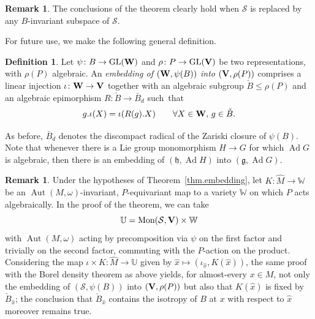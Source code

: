 \documentclass[10pt,a4paper]{amsart}
\numberwithin{equation}{section}
\theoremstyle{definition}
\newtheorem{defin}[thm]{Definition}
\newtheorem{rem}[thm]{Remark}
\def\V{{\bf V}}
\def\W{{\bf W}}
\newcommand{\cS}{{\mathcal S}}
\newcommand{\lieh}{\mathfrak{h}}
\def\g{{\mathfrak g}}
\newcommand{\Aut}{\operatorname{Aut}}
\newcommand{\Ad}{\operatorname{Ad}}
\newcommand{\GL}{{\operatorname{GL}}}
\begin{document}
\begin{rem}
The conclusions of the theorem clearly hold when $\mathcal{S}$ is replaced by any $B$-invariant subspace of $\mathcal{S}$.
\end{rem}

For future use, we make the following general definition.

\begin{defin}
\label{def.rep.embedding}
Let $\psi\colon B \rightarrow \GL({\W})$ and $\rho \colon P \rightarrow \GL({\V})$ be two representations, with $\rho(P)$ algebraic. An \emph{embedding of $({\W}, \psi(B))$ into $({\V}, \rho(P))$} comprises a linear injection $\iota\colon {\W} \rightarrow {\V}$ together with an algebraic subgroup $\check{B} \leq \rho(P)$ and an algebraic epimorphism $R\colon \check{B} \rightarrow \bar{B}_d$ such~that
\[ g. \iota(X) = \iota( R(g).X) \qquad \forall X \in {\bf W}, \, g \in \check{B}.\]
\end{defin}

As before, $\bar{B}_d$ denotes the discompact radical of the Zariski closure of $\psi(B)$.
Note that whenever there is a Lie group monomorphism $H \rightarrow G$ for which $\Ad G$ is algebraic, then there is an embedding of $(\lieh, \Ad H)$ into $(\g, \Ad G)$.

\begin{rem}
Under the hypotheses of Theorem~\ref{thm.embedding}, let
$K \colon \hat{M} \rightarrow \mathbb{W}$ be an $\Aut(M,\omega)$-invariant, $P$-equivariant map to a variety $\mathbb{W}$ on
 which $P$ acts algebraically.
 In the proof of the theorem, we can take
\[\mathbb{U} =\textrm{Mon}(\cS, \V)\times \mathbb{W}\]
with $\Aut(M,\omega)$ acting by precomposition via $\psi$ on the first factor and trivially on the second factor, commuting with the $P$-action on the product.
Considering the map $\iota \times K \colon \hat{M}\rightarrow \mathbb{U}$ given
by $\hat{x} \mapsto (\iota_{\hat{x}}, K(\hat{x}))$, the same proof with the Borel density theorem as above yields, for almost-every $x \in M$, not only the embedding of $(\mathcal{S}, \psi(B))$ into $({\bf V}, \rho(P))$ but also that $K(\hat{x})$ is fixed by $\check{B}_{\hat{x}}$; the conclusion that $\check{B}_{\hat{x}}$ contains the isotropy of $B$ at $x$ with respect to $\hat{x}$ moreover remains true.
\end{rem}
\end{document}
